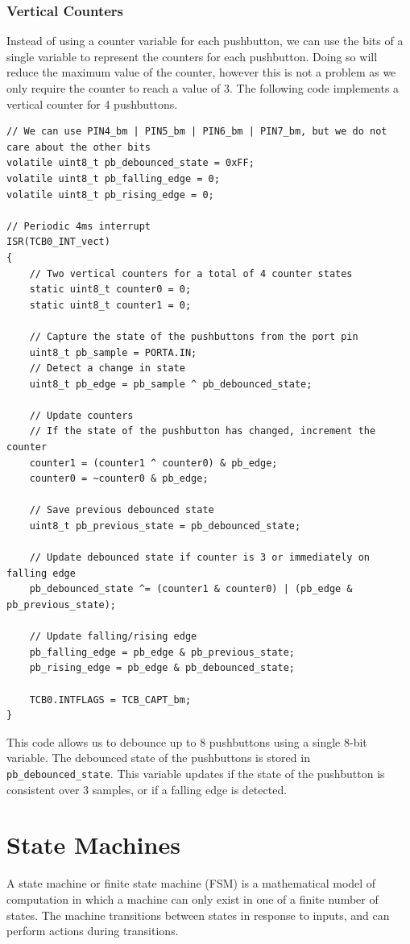 \documentclass{report}
\begin{document}
\subsection{Vertical Counters}
Instead of using a counter variable for each pushbutton, we can use the
bits of a single variable to represent the counters for each pushbutton.
Doing so will reduce the maximum value of the counter, however this is
not a problem as we only require the counter to reach a value of 3.
The following code implements a vertical counter for 4 pushbuttons.
\begin{verbatim}
// We can use PIN4_bm | PIN5_bm | PIN6_bm | PIN7_bm, but we do not care about the other bits
volatile uint8_t pb_debounced_state = 0xFF;
volatile uint8_t pb_falling_edge = 0;
volatile uint8_t pb_rising_edge = 0;

// Periodic 4ms interrupt
ISR(TCB0_INT_vect)
{
    // Two vertical counters for a total of 4 counter states
    static uint8_t counter0 = 0;
    static uint8_t counter1 = 0;

    // Capture the state of the pushbuttons from the port pin
    uint8_t pb_sample = PORTA.IN;
    // Detect a change in state
    uint8_t pb_edge = pb_sample ^ pb_debounced_state;

    // Update counters
    // If the state of the pushbutton has changed, increment the counter
    counter1 = (counter1 ^ counter0) & pb_edge;
    counter0 = ~counter0 & pb_edge;

    // Save previous debounced state
    uint8_t pb_previous_state = pb_debounced_state;

    // Update debounced state if counter is 3 or immediately on falling edge
    pb_debounced_state ^= (counter1 & counter0) | (pb_edge & pb_previous_state);

    // Update falling/rising edge
    pb_falling_edge = pb_edge & pb_previous_state;
    pb_rising_edge = pb_edge & pb_debounced_state;

    TCB0.INTFLAGS = TCB_CAPT_bm;
}
\end{verbatim}
This code allows us to debounce up to 8 pushbuttons using a single 8-bit
variable. The debounced state of the pushbuttons is stored in \texttt{pb_debounced_state}.
This variable updates if the state of the pushbutton is consistent over 3 samples,
or if a falling edge is detected.
\chapter{State Machines}
A state machine or finite state machine (FSM) is a mathematical model of computation in which a machine can only exist in one of a finite
number of states. The machine transitions between states in response to inputs, and can perform actions during transitions.
\end{document}
